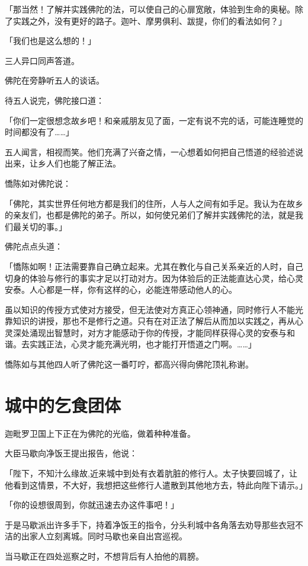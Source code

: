 \documentclass[twoside,openany]{book}
\begin{document}
「那当然！了解并实践佛陀的法，可以使自己的心扉宽敞，体验到生命的奥秘。除了实践之外，没有更好的路子。迦叶、摩男俱利、跋提，你们的看法如何？」 

「我们也是这么想的！」

三人异口同声答道。

佛陀在旁静听五人的谈话。

待五人说完，佛陀接口道：

「你们一定很想念故乡吧！和亲戚朋友见了面，一定有说不完的话，可能连睡觉的时间都没有了……」

五人闻言，相视而笑。他们充满了兴奋之情，一心想着如何把自己悟道的经验述说出来，让乡人们也能了解正法。

憍陈如对佛陀说：

「佛陀，其实世界任何地方都是我们的住所，人与人之间有如手足。我认为在故乡的亲友们，也都是佛陀的弟子。所以，如何使兄弟们了解并实践佛陀的法，就是我们最关切的事。」

佛陀点点头道：

「憍陈如啊！正法需要靠自己确立起来。尤其在教化与自己关系亲近的人时，自己切身的体验与修行的事实才足以打动对方。因为体验后的正法能直达心灵，给心灵安泰。人心都是一样，你有这样的心，必能连带感动他人的心。

虽以知识的传授方式使对方接受，但无法使对方真正心领神通，同时修行人不能光靠知识的讲授，那也不是修行之道。只有在对正法了解后从而加以实践之，再从心灵深处涌现出智慧时，对方才能感动于你的传授，才能同样获得心灵的安泰与和谐。去实践正法，心灵才能充满光明，也才能打开悟道之门啊。……」

憍陈如与其他四人听了佛陀这一番叮咛，都高兴得向佛陀顶礼称谢。

\section{城中的乞食团体}\label{sec8.2}

迦毗罗卫国上下正在为佛陀的光临，做着种种准备。

大臣马歇向净饭王提出报告，他说：

「陛下，不知汁么缘故,近来城中到处有衣着肮脏的修行人。太子快要回城了，让他看到这情景，不大好，我想把这些修行人遣散到其他地方去，特此向陛下请示。」

「你的设想很周到，你就迅速去办这件事吧！」

于是马歇派出许多手下，持着净饭王的指令，分头利城中各角落去劝导那些衣冠不洁的出家人立刻离城。同时马歇也亲自出宫巡视。

当马歇正在四处巡察之时，不想背后有人拍他的肩膀。
\end{document}
